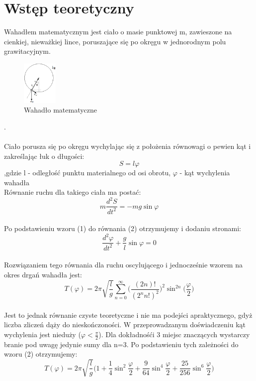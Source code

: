 \documentclass[a4paper,10pt]{article}
\begin{document}
\section{Wstęp teoretyczny}
Wahadłem matematycznym jest ciało o masie punktowej m, zawieszone na cienkiej, nieważkiej lince, poruszające się po okręgu w jednorodnym polu grawitacyjnym.
\\
\begin{figure}[H]
\centering
\includegraphics[width=0.15\textwidth]{wahadlo.png}
\caption{Wahadło matematyczne}
\end{figure}.
\\
\\Ciało porusza się po okręgu wychylając się z położenia równowagi o pewien kąt  i zakreślając łuk o długości:
\begin{equation}
S = l\varphi
\end{equation}
,gdzie l - odległość punktu materialnego od osi obrotu, $\varphi$ - kąt wychylenia wahadła
\\ Równanie ruchu dla takiego ciała ma postać:
\begin{equation}
m\frac{d^2S}{dt^2} = -mg\sin\varphi
\end{equation}
\\Po podstawieniu wzoru (1) do równania (2) otrzymujemy i dodaniu stronami:
\begin{equation}
\frac{d^2\varphi}{dt^2} + \frac{g}{l}\sin\varphi = 0
\end{equation}
\\Rozwiązaniem tego równania dla ruchu oscylującego i jednocześnie wzorem na okres drgań wahadła jest:
\begin{equation}
T(\varphi) = 2\pi\sqrt{\frac{l}{g}}\sum_{n=0}^{\infty}\bigg(\frac{(2n)!}{(2^nn!)^2}\bigg)^2\sin^{2n}\bigg(\frac{\varphi}{2}\bigg)
\end{equation}
\\Jest to jednak równanie czyste teoretyczne i nie ma podejści apraktycznego, gdyż liczba zliczeń dąży do nieskończoności. W przeprowadzanym doświadczeniu kąt wychylenia jest nieduży ($\varphi<\frac{\pi}{2}$). Dla dokładnośći 3 miejsc znaczących wystarczy branie pod uwagę jedynie sumy dla n=3. Po podstawieniu tych zależności do wzoru (2) otrzymujemy:
\begin{equation}
T(\varphi) = 2\pi\sqrt{\frac{l}{g}}\bigg(1+\frac{1}{4}\sin^2\frac{\varphi}{2}+\frac{9}{64}\sin^4\frac{\varphi}{2}+\frac{25}{256}\sin^6\frac{\varphi}{2}\bigg)
\end{equation}
\end{document}
